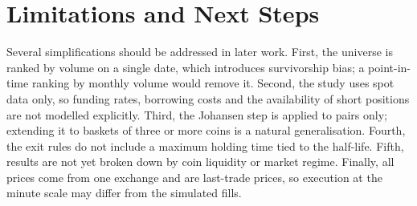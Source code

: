 \documentclass[10pt,a4paper,twocolumn]{article}
\begin{document}
	\section{Limitations and Next Steps}
	\label{sec:limits}
	Several simplifications should be addressed in later work. First, the universe is ranked by volume on a single date, which introduces survivorship bias; a point-in-time ranking by monthly volume would remove it. Second, the study uses spot data only, so funding rates, borrowing costs and the availability of short positions are not modelled explicitly. Third, the Johansen step is applied to pairs only; extending it to baskets of three or more coins is a natural generalisation. Fourth, the exit rules do not include a maximum holding time tied to the half-life. Fifth, results are not yet broken down by coin liquidity or market regime. Finally, all prices come from one exchange and are last-trade prices, so execution at the minute scale may differ from the simulated fills.
	
\end{document}
